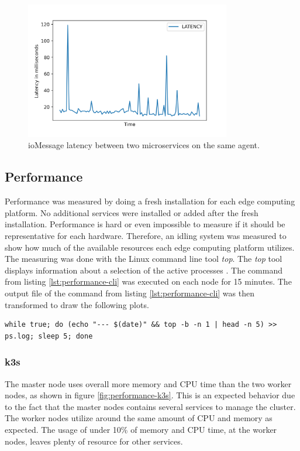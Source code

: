 \begin{figure}[H]
    \centering
    \includegraphics[width=0.8\textwidth]{assets/iofog/latency/plots/latency.png}
    \caption{ioMessage latency between two microservices on the same agent.}\label{fig:ioFog-iomessage-latency}
\end{figure}

\subsection*{Performance}
Performance was measured by doing a fresh installation for each edge computing platform. No additional services were installed or added after the fresh installation. Performance is hard or even impossible to measure if it should be representative for each hardware. Therefore, an idling system was measured to show how much of the available resources each edge computing platform utilizes. The measuring was done with the Linux command line tool \textit{top}. The \textit{top} tool displays information about a selection of the active processes \cite{topUserManual}. The command from listing \ref{lst:performance-cli} was executed on each node for 15 minutes. The output file of the command from listing \ref{lst:performance-cli} was then transformed to draw the following plots.

\begin{lstlisting}[caption={Command to dump CPU and memory utilization.},label={lst:performance-cli},captionpos=b]
while true; do (echo "--- $(date)" && top -b -n 1 | head -n 5) >> ps.log; sleep 5; done
\end{lstlisting}

\subsubsection*{k3s}
The master node uses overall more memory and CPU time than the two worker nodes, as shown in figure \ref{fig:performance-k3s}. This is an expected behavior due to the fact that the master nodes contains several services to manage the cluster. The worker nodes utilize around the same amount of CPU and memory as expected. The usage of under 10\% of memory and CPU time, at the worker nodes, leaves plenty of resource for other services.

